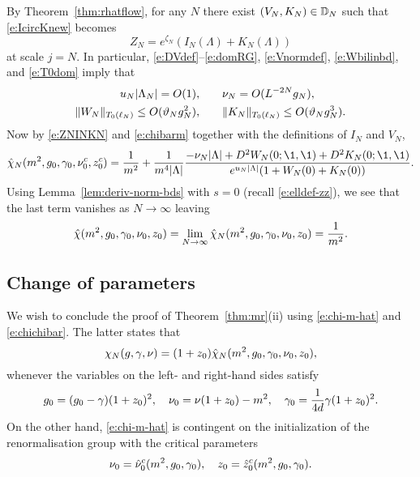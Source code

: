 By Theorem~\ref{thm:rhatflow}, for any $N$ there exist
$(V_N, K_N) \in \mathbb{D}_N$ such that \eqref{e:IcircKnew} becomes
\begin{equation}
\label{e:ZNINKN}
Z_N = e^{\zeta_N} (I_N(\Lambda) + K_N(\Lambda))
\end{equation}
at scale $j = N$. In particular, \eqref{e:DVdef}--\eqref{e:domRG},
\eqref{e:Vnormdef}, \eqref{e:Wbilinbd}, and \eqref{e:T0dom} imply that
\begin{align}
\label{e:unu-bd}
u_N |\Lambda_N| = O(1),
	&\qquad
\nu_N = O(L^{-2 N} g_N),
	\\
\label{e:WKbd}
\|W_N\|_{T_0(\ell_N)} \le O(\vartheta_N g_N^2),
	&\qquad
\|K_N\|_{T_0(\ell_N)} \le O(\vartheta_N g_N^3).
\end{align}
Now by \eqref{e:ZNINKN} and \eqref{e:chibarm} together with the definitions of $I_N$ and $V_N$,
\begin{equation}
\hat\chi_N(m^2, \gcc_0, \gamma_0, \nu_0^c, z_0^c)
	=
\frac{1}{m^2}
	+
\frac{1}{m^4 |\Lambda|}
\frac{-\nu_N |\Lambda| + D^2 W_N(0; \1, \1) + D^2 K_N(0; \1, \1)}{e^{u_N |\Lambda|} (1 + W_N(0) + K_N(0))}.
\end{equation}
Using Lemma~\ref{lem:deriv-norm-bds} with $s = 0$ (recall \eqref{e:elldef-zz}),
we see that the last term vanishes as $N\to\infty$ leaving
\begin{equation}
\label{e:chi-m-hat}
\hat\chi(m^2, g_0, \gamma_0, \nu_0, z_0)
	=
\lim_{N\rightarrow\infty} \hat\chi_N(m^2, g_0, \gamma_0, \nu_0, z_0)
	=
\frac{1}{m^2}.
\end{equation}


\subsection{Change of parameters}
\label{sec:nuztilde}

We wish to conclude the proof of Theorem~\ref{thm:mr}(ii) using \eqref{e:chi-m-hat}
and \eqref{e:chichibar}. The latter states that
\begin{equation}
\label{e:chichihat}
\chi_N(g, \gamma, \nu)
	=
(1 + z_0) \hat\chi_N(m^2, g_0, \gamma_0, \nu_0, z_0),
\end{equation}
whenever the variables on the left- and right-hand sides satisfy
\begin{equation}
\label{e:gg0-re}
g_0 = (g_0 - \gamma) (1 + z_0)^2,
\quad
\nu_0 = \nu (1 + z_0) - m^2,
\quad
\gamma_0 = \frac{1}{4d} \gamma (1 + z_0)^2.
\end{equation}
On the other hand, \eqref{e:chi-m-hat} is contingent on the initialization of
the renormalisation group with the critical parameters
\begin{equation}
\label{e:crit-constraint}
\nu_0 = \hat \nu_0^c(m^2, g_0, \gamma_0),
	\quad
z_0   = \hat z_0^c(m^2, g_0, \gamma_0).
\end{equation}

